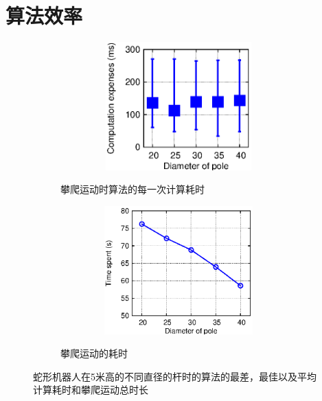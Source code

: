 \section{算法效率}

\begin{figure}[htbp]
	\centering
	\begin{subfigure}{0.45\textwidth}{
		\centering
		\includegraphics[width=1\textwidth,height=140pt]{figure/chap05/figCE.eps}
		\label{fig:CE}
		\caption{攀爬运动时算法的每一次计算耗时}
	}
	\end{subfigure}
	\begin{subfigure}{0.45\textwidth}{
		\centering
		\includegraphics[width=1\textwidth,height=140pt]{figure/chap05/TimeSpent.eps}
		\label{fig:TS}
		\caption{攀爬运动的耗时}
	}
	\end{subfigure}
	\caption{蛇形机器人在5米高的不同直径的杆时的算法的最差，最佳以及平均计算耗时和攀爬运动总时长}
	\label{fig:CE-TS}
\end{figure}



